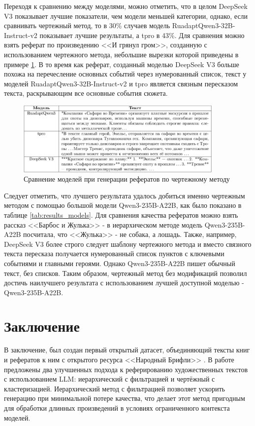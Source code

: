 \documentclass{article}
\begin{document}
Переходя к сравнению между моделями, можно отметить, что в целом DeepSeek V3 показывает лучшие показатели, чем модели меньшей категории, однако, если сравнивать чертежный метод, то в 30\% случаев модель 
RuadaptQwen3-\allowbreak 32B-\allowbreak Instruct-\allowbreak v2 показывает лучшие результаты, а tpro в 43\%. Для сравнения можно взять реферат по произведению <<И грянул гром>>, созданную с использованием чертежного метода, 
небольшие вырезки которой приведены в примере \ref{fig:bl_ref}.
В то время как реферат, созданный моделью DeepSeek V3 больше похожа на перечесление основных событий через нумерованный список,
текст у моделей RuadaptQwen3-\allowbreak 32B-\allowbreak Instruct-\allowbreak v2 и tpro является связным пересказом текста, раскрывающим все основные события сюжета.

\begin{figure}[ht!]
  \centering
  \includegraphics[width=0.9\textwidth]{figures/three_ref.png}
  \caption{Сравнение моделей при генерации рефератов по чертежному методу}
  \label{fig:bl_ref}
\end{figure}

Следует отметить, что лучшего результата удалось добиться именно чертежным методом с помощью большой модели Qwen3-\allowbreak 235B-\allowbreak A22B, 
как было показано в таблице \ref{tab:results_models}. Для сравнения качества рефератов можно взять рассказ <<Барбос и Жулька>> - в иерархическом методе
модель Qwen3-\allowbreak 235B-\allowbreak A22B посчитала, что <<Жулька>> - не собака, а лошадь. Также, например, DeepSeek V3 более строго следует шаблону чертежного метода и вместо связного текста пересказа получается нумерованный список
пунктов с ключевыми событиями и главными героями. Однако Qwen3-\allowbreak 235B-\allowbreak A22B пишет обычный текст, без списков. Таким образом, чертежный метод без модификаций позволил достичь наилучшего результата с использованием лучшей доступной моделью - 
Qwen3-\allowbreak 235B-\allowbreak A22B.


\section*{Заключение}
В заключение, был создан первый открытый датасет, объединяющий тексты книг и рефератов к ним с открытого ресурса <<Народный Брифли>> \cite{Briefly}. 
В работе предложены два улучшенных подхода к реферированию художественных текстов с использованием LLM: иерархический с фильтрацией и чертёжный с кластеризацией. 
Иерархический метод с фильтрацией позволяет ускорить генерацию при минимальной потере качества, 
что делает этот метод пригодным для обработки длинных произведений в условиях ограниченного контекста моделей.  
\end{document}
